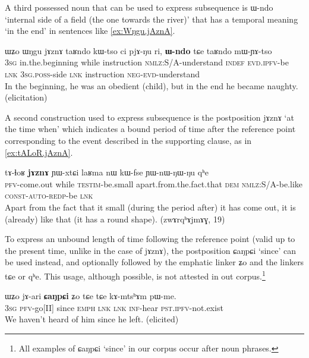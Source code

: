 \documentclass[oldfontcommands,oneside,a4paper,11pt]{article}
\newcommand{\ipa}[1]{{\phon \mbox{#1}}} %
\begin{document}
A third possessed noun that can be used to express subsequence is \ipa{ɯ-ndo} `internal side of a field (the one towards the river)' that has a temporal meaning `in the end' in sentences like \ref{ex:Wŋgu.jAznA}.

\begin{exe}
\ex \label{ex:Wŋgu.jAznA}
\gll 
\ipa{ɯʑo}  	\ipa{ɯŋgu}  	\ipa{jɤznɤ}  	\ipa{taʁndo}  	\ipa{kɯ-tso}  	\ipa{ci}  	\ipa{pjɤ-ŋu}  	\ipa{ri,}  	\ipa{\textbf{ɯ-ndo}}  	\ipa{tɕe}  	\ipa{taʁndo}  	\ipa{mɯ-ɲɤ-tso}  	\\
\textsc{3sg} in.the.beginning while instruction \textsc{nmlz}:S/A-understand \textsc{indef} \textsc{evd.ipfv}-be \textsc{lnk} \textsc{3sg.poss}-side \textsc{lnk} instruction \textsc{neg-evd}-understand \\
\glt In the beginning, he was an obedient (child), but in the end he became naughty. (elicitation)
\end{exe}

A second construction used to express subsequence is the postposition \ipa{jɤznɤ} `at the time when' which indicates a bound period of time after the reference point corresponding to the event described in the supporting clause, as in \ref{ex:tALoR.jAznA}.

\begin{exe}
\ex \label{ex:tALoR.jAznA}
\gll 
\ipa{tɤ-ɬoʁ}  	\ipa{\textbf{jɤznɤ}}  	\ipa{ɲɯ-xtɕi}  	\ipa{laʁma}  	\ipa{nɯ}  	\ipa{kɯ-fse}  	\ipa{ɲɯ-nɯ-ŋɯ-ŋu}  	\ipa{qʰe}  \\
\textsc{pfv}-come.out  while \textsc{testim}-be.small apart.from.the.fact.that \textsc{dem} \textsc{nmlz}:S/A-be.like \textsc{const-auto-redp}-be \textsc{lnk} \\
\glt Apart from the fact that it small (during the period after) it has come out, it is (already) like that (it has a round shape). (zwɤrqʰɤjmɤɣ, 19)
	\end{exe}


 To express an unbound length of time following the reference point (valid up to the present time, unlike in the case of \ipa{jɤznɤ}), the postposition \ipa{ɕaŋpɕi} `since'  can be used instead, and optionally followed by the emphatic linker \ipa{ʑo} and the linkers \ipa{tɕe} or \ipa{qʰe}. This usage, although possible, is not attested in out corpus.\footnote{All examples of \ipa{ɕaŋpɕi} `since' in our corpus occur after noun phrases.}
  \begin{exe}
\ex \label{ex:jariCaNpCi} 
\gll
 \ipa{ɯʑo}   	\ipa{jɤ-ari}   	\textbf{\ipa{ɕaŋpɕi}}   	\ipa{ʑo}   	\ipa{tɕe}   	\ipa{tɕe}   	\ipa{kɤ-mtsʰɤm}   	\ipa{pɯ-me.}   	\\
\textsc{3sg} \textsc{pfv}-go[II] since \textsc{emph} \textsc{lnk}  \textsc{lnk} \textsc{inf}-hear \textsc{pst.ipfv}-not.exist \\
 \glt We haven't heard of him since he left. (elicited)
\end{exe}
 
\end{document}
